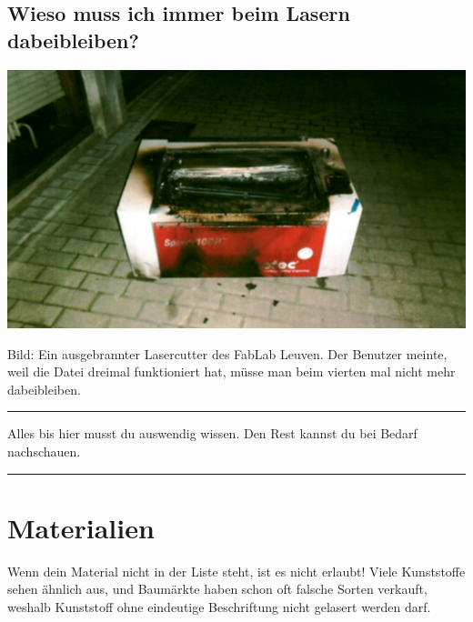 \documentclass{\basedir/fablab-document}
\begin{document}
	\subsection{Wieso muss ich immer beim Lasern dabeibleiben?}
	\includegraphics[width=.75\linewidth]{./img/laser-abgebrannt_fablab_leuven.jpg}

	Bild: Ein ausgebrannter Lasercutter des FabLab Leuven. Der Benutzer meinte, weil die Datei dreimal funktioniert hat, müsse man beim vierten mal nicht mehr dabeibleiben.



	\vspace{5em}
	\hrule

	Alles bis hier musst du auswendig wissen. Den Rest kannst du bei Bedarf nachschauen.
	\vspace{0.2em}
	\hrule
	\vspace{3em}

	\newpage %

	\section{Materialien}\label{sec:material}
	Wenn dein Material nicht in der Liste steht, ist es nicht erlaubt! Viele Kunststoffe sehen ähnlich aus, und Baumärkte haben schon oft falsche Sorten verkauft, weshalb Kunststoff ohne eindeutige Beschriftung nicht gelasert werden darf.
\end{document}
